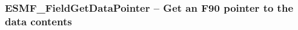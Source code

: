  
\setlength{\parskip}{0pt}
\setlength{\parindent}{0pt}
\setlength{\baselineskip}{11pt}
 
\def\bv{\begin{verbatim}}
\def\ev{\end{verbatim}}
\def\be{\begin{equation}}
\def\ee{\end{equation}}
\def\bea{\begin{eqnarray}}
\def\eea{\end{eqnarray}}
\def\bi{\begin{itemize}}
\def\ei{\end{itemize}}
\def\bn{\begin{enumerate}}
\def\en{\end{enumerate}}
\def\bd{\begin{description}}
\def\ed{\end{description}}
\def\({\left (}
\def\){\right )}
\def\[{\left [}
\def\]{\right ]}
\def\<{\left  \langle}
\def\>{\right \rangle}
\def\cI{{\cal I}}
\def\diag{\mathop{\rm diag}}
\def\tr{\mathop{\rm tr}}


 
\subsubsection [ESMF\_FieldGetDataPointer] {ESMF\_FieldGetDataPointer -- Get an F90 pointer to the data contents}


